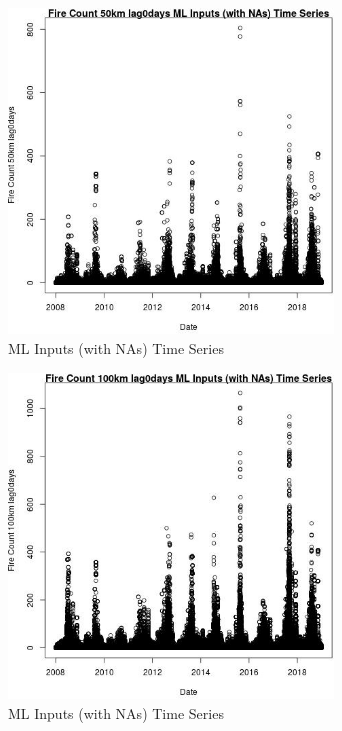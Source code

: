 \begin{figure} 
\centering  
\includegraphics[width=0.77\textwidth]{Code_Outputs/Report_ML_input_PM25_Step4_part_f_de_duplicated_aves_prioritize_24hr_obswNAs_Fire_Count_50km_lag0daysvDate.jpg} 
\caption{\label{fig:Report_ML_input_PM25_Step4_part_f_de_duplicated_aves_prioritize_24hr_obswNAsFire_Count_50km_lag0daysvDate}ML Inputs (with NAs) Time Series} 
\end{figure} 
 

\clearpage 

\begin{figure} 
\centering  
\includegraphics[width=0.77\textwidth]{Code_Outputs/Report_ML_input_PM25_Step4_part_f_de_duplicated_aves_prioritize_24hr_obswNAs_Fire_Count_100km_lag0daysvDate.jpg} 
\caption{\label{fig:Report_ML_input_PM25_Step4_part_f_de_duplicated_aves_prioritize_24hr_obswNAsFire_Count_100km_lag0daysvDate}ML Inputs (with NAs) Time Series} 
\end{figure} 
 

